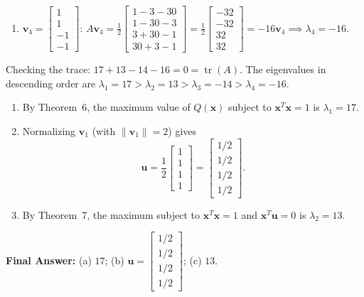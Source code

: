 \documentclass[11pt, letterpaper]{article}
\theoremstyle{definition}
\theoremstyle{remark}
\begin{document}
\begin{enumerate}[label=(\arabic*)]
    \item $\mathbf{v}_4 = \begin{bmatrix} 1 \\ 1 \\ -1 \\ -1 \end{bmatrix}$: \quad $A\mathbf{v}_4 = \frac{1}{2}\begin{bmatrix} 1-3-30 \\ 1-30-3 \\ 3+30-1 \\ 30+3-1 \end{bmatrix} = \frac{1}{2}\begin{bmatrix} -32 \\ -32 \\ 32 \\ 32 \end{bmatrix} = -16\mathbf{v}_4 \implies \lambda_4 = -16$.
\end{enumerate}
Checking the trace: $17 + 13 - 14 - 16 = 0 = \operatorname{tr}(A)$. The eigenvalues in descending order are $\lambda_1 = 17 > \lambda_2 = 13 > \lambda_3 = -14 > \lambda_4 = -16$.
\begin{enumerate}[label=(\alph*)]
    \item By Theorem~6, the maximum value of $Q(\mathbf{x})$ subject to $\mathbf{x}^T \mathbf{x} = 1$ is $\lambda_1 = 17$.
    \item Normalizing $\mathbf{v}_1$ (with $\|\mathbf{v}_1\| = 2$) gives
    \[
    \mathbf{u} = \frac{1}{2}\begin{bmatrix} 1 \\ 1 \\ 1 \\ 1 \end{bmatrix} = \begin{bmatrix} 1/2 \\ 1/2 \\ 1/2 \\ 1/2 \end{bmatrix}.
    \]
    \item By Theorem~7, the maximum subject to $\mathbf{x}^T \mathbf{x} = 1$ and $\mathbf{x}^T \mathbf{u} = 0$ is $\lambda_2 = 13$.
\end{enumerate}

\textbf{Final Answer:} (a) $17$; (b) $\mathbf{u} = \begin{bmatrix} 1/2 \\ 1/2 \\ 1/2 \\ 1/2 \end{bmatrix}$; (c) $13$.
\end{document}
